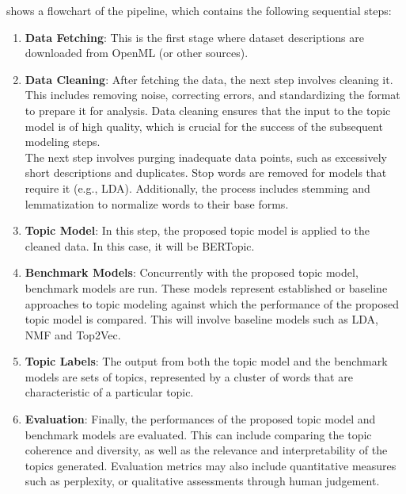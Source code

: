 \documentclass{article}
\begin{document}
 shows a flowchart of the pipeline, which contains the following sequential steps:

\begin{enumerate}

    \item \textbf{Data Fetching}: This is the first stage where dataset descriptions are downloaded from OpenML (or other sources).

    \item \textbf{Data Cleaning}: After fetching the data, the next step involves cleaning it. This includes removing noise, correcting errors, and standardizing the format to prepare it for analysis. Data cleaning ensures that the input to the topic model is of high quality, which is crucial for the success of the subsequent modeling steps. \\ The next step involves purging inadequate data points, such as excessively short descriptions and duplicates. Stop words are removed for models that require it (e.g., LDA). Additionally, the process includes stemming and lemmatization to normalize words to their base forms.

    \item \textbf{Topic Model}: In this step, the proposed topic model is applied to the cleaned data. In this case, it will be BERTopic.

    \item \textbf{Benchmark Models}: Concurrently with the proposed topic model, benchmark models are run. These models represent established or baseline approaches to topic modeling against which the performance of the proposed topic model is compared. This will involve baseline models such as LDA, NMF and Top2Vec.

    \item \textbf{Topic Labels}: The output from both the topic model and the benchmark models are sets of topics, represented by a cluster of words that are characteristic of a particular topic.

    \item \textbf{Evaluation}: Finally, the performances of the proposed topic model and benchmark models are evaluated. This can include comparing the topic coherence and diversity, as well as the relevance and interpretability of the topics generated. Evaluation metrics may also include quantitative measures such as perplexity, or qualitative assessments through human judgement.

\end{enumerate}
\end{document}
